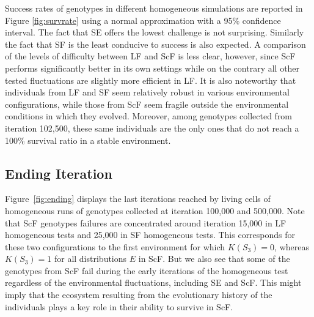 Success rates of genotypes in different homogeneous simulations are reported in Figure \ref{fig:survrate} using a normal approximation with a 95\% confidence interval. The fact that SE offers the lowest challenge is not surprising. Similarly the fact that SF is the least conducive to success is also expected. A comparison of the levels of difficulty between LF and ScF is less clear, however, since ScF performs significantly better in its own settings while on the contrary all other tested fluctuations are slightly more efficient in LF. It is also noteworthy that individuals from LF and SF seem relatively robust in various environmental configurations, while those from ScF seem fragile outside the environmental conditions in which they evolved. Moreover, among genotypes collected from iteration 102,500, these same individuals are the only ones that do not reach a 100\% survival ratio in a stable environment.

\subsection{Ending Iteration}

Figure~\ref{fig:ending} displays the last iterations reached by living cells of homogeneous runs of genotypes collected at iteration 100,000 and 500,000. Note that ScF genotypes failures are concentrated around iteration 15,000 in LF homogeneous tests and 25,000 in SF homogeneous tests. This corresponds for these two configurations to the first environment for which $K(S_3) = 0$, whereas $K(S_3) = 1$ for all distributions $E$ in ScF. But we also see that some of the genotypes from ScF fail during the early iterations of the homogeneous test regardless of the environmental fluctuations, including SE and ScF. This might imply that the ecosystem resulting from the evolutionary history of the individuals plays a key role in their ability to survive in ScF.

